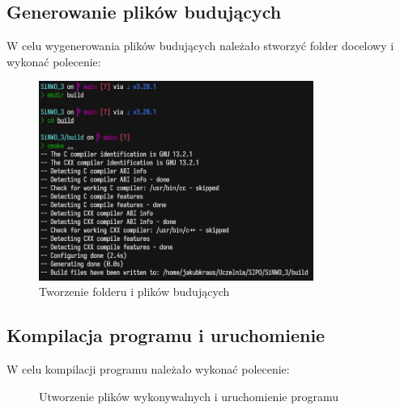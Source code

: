 \documentclass[a4paper,12pt]{article}
\begin{document}
\subsection{Generowanie plików budujących}
W celu wygenerowania plików budujących należało stworzyć folder docelowy i wykonać polecenie:
\begin{figure}[ht]
    \centering
    \includegraphics[width=0.8\textwidth]{images/gnu-build.png}
    \caption{Tworzenie folderu i plików budujących}
\end{figure}

\newpage
\clearpage

\subsection{Kompilacja programu i uruchomienie}
W celu kompilacji programu należało wykonać polecenie:
\begin{figure}[ht]
    \centering
    \vfill
    \caption{Utworzenie plików wykonywalnych i uruchomienie programu}
\end{figure}
\end{document}
